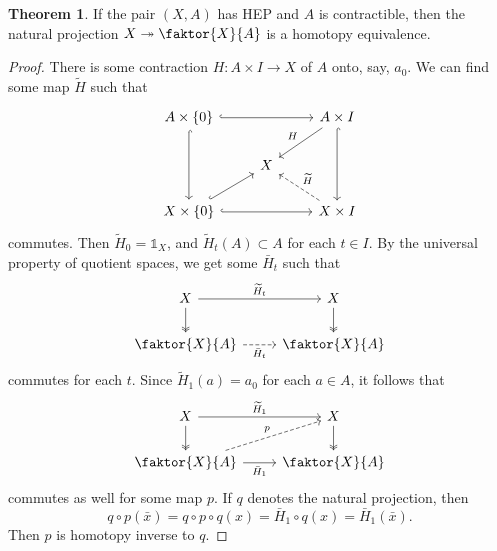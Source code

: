 \documentclass[10pt,letterpaper,cm]{nupset}
\theoremstyle{definition}
\theoremstyle{theorem}
\newtheorem{theorem}[definition]{Theorem}
\theoremstyle{remark}
\newcommand{\1}{\mathbb{1}}
\newcommand{\0}{\vec 0}
\begin{document}
\begin{theorem}
If the pair $(X, A)$ has HEP and $A$ is contractible, then the natural projection $X \twoheadrightarrow \faktor{X}{A}$ is a homotopy equivalence. 
\end{theorem}
\begin{proof}
There is some contraction $H: A \times I\to X$ of $A$ onto, say, $a_0$. We can find some map $\widetilde{H}$ such that 
\[
\begin{tikzcd}
A\times \{0\} \arrow[rr, hook] \arrow[dd, hook] &  & A\times I \arrow[dd, hook] \arrow[ld, "H"'] \\
 & X &  \\
X\times \{0\} \arrow[rr, hook] \arrow[ru, hook] &  & X\times I \arrow[lu, "\widetilde{H}"', dashed]
\end{tikzcd}
\] commutes. Then $\widetilde{H}_0 = \1_X$, and $\widetilde{H}_t(A) \subset A$ for each $t\in I$. By the universal property of quotient spaces, we get some $\bar{H}_t$ such that
\[
\begin{tikzcd}
X \arrow[d, two heads] \arrow[r, "\widetilde{H}_t"] & X \arrow[d, two heads] \\
\faktor{X}{A} \arrow[r, "\bar{H}_t"', dashed] & \faktor{X}{A}
\end{tikzcd}
\] commutes for each $t$. Since $\widetilde{H}_1(a) = a_0$ for each $a\in A$, it follows that 
\[
\begin{tikzcd}
X \arrow[d, two heads] \arrow[r, "\widetilde{H}_1"] & X \arrow[d, two heads] \\
\faktor{X}{A} \arrow[r, "\bar{H}_1"'] \arrow[ru, "p", dashed] & \faktor{X}{A}
\end{tikzcd}
\] commutes as well for some map $p$. If $q$ denotes the natural projection, then $$q\circ p(\bar{x}) = q \circ p \circ q({x}) = \bar{H}_1 \circ q({x}) = \bar{H}_1(\bar{x}).$$ Then $p$ is homotopy inverse to $q$.
\end{proof}
\end{document}
